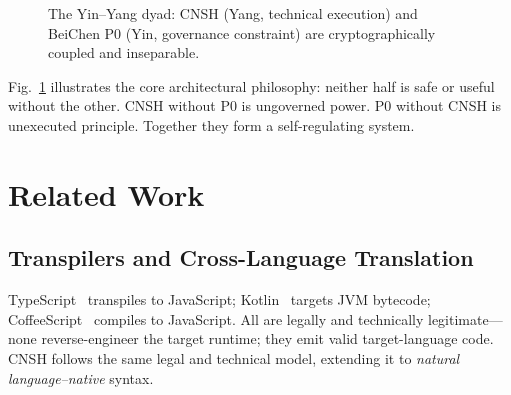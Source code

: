 \documentclass[conference]{IEEEtran}
\begin{document}
\begin{figure}[t]
\centering
{}
\caption{The Yin--Yang dyad: CNSH (Yang, technical execution)
  and BeiChen P0 (Yin, governance constraint) are
  cryptographically coupled and inseparable.}
\label{fig:yinyang}
\end{figure}

Fig.~\ref{fig:yinyang} illustrates the core architectural
philosophy: neither half is safe or useful without the other.
CNSH without P0 is ungoverned power.
P0 without CNSH is unexecuted principle.
Together they form a self-regulating system.

\section{Related Work}

\subsection{Transpilers and Cross-Language Translation}
TypeScript~\cite{TypeScript2012} transpiles to JavaScript;
Kotlin~\cite{Kotlin2011} targets JVM bytecode;
CoffeeScript~\cite{CoffeeScript2009} compiles to JavaScript.
All are legally and technically legitimate---none reverse-engineer
the target runtime; they emit valid target-language code.
CNSH follows the same legal and technical model, extending it
to \emph{natural language--native} syntax.
\end{document}
